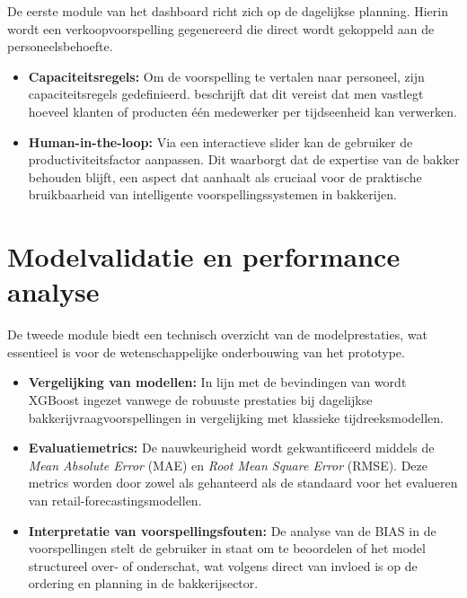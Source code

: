 De eerste module van het dashboard richt zich op de dagelijkse planning. Hierin wordt een verkoopvoorspelling gegenereerd die direct wordt gekoppeld aan de personeelsbehoefte.

\begin{itemize}
    \item \textbf{Capaciteitsregels:} Om de voorspelling te vertalen naar personeel, zijn capaciteitsregels gedefinieerd. \cite{Geboers2012} beschrijft dat dit vereist dat men vastlegt hoeveel klanten of producten één medewerker per tijdseenheid kan verwerken.
    \item \textbf{Human-in-the-loop:} Via een interactieve slider kan de gebruiker de productiviteitsfactor aanpassen. Dit waarborgt dat de expertise van de bakker behouden blijft, een aspect dat \cite{Subekti2025} aanhaalt als cruciaal voor de praktische bruikbaarheid van intelligente voorspellingssystemen in bakkerijen.
\end{itemize}

\section{Modelvalidatie en performance analyse}
\label{sec:performance}

De tweede module biedt een technisch overzicht van de modelprestaties, wat essentieel is voor de wetenschappelijke onderbouwing van het prototype.

\begin{itemize}
    \item \textbf{Vergelijking van modellen:} In lijn met de bevindingen van \cite{Easter2024} wordt XGBoost ingezet vanwege de robuuste prestaties bij dagelijkse bakkerijvraagvoorspellingen in vergelijking met klassieke tijdreeksmodellen.
    \item \textbf{Evaluatiemetrics:} De nauwkeurigheid wordt gekwantificeerd middels de \textit{Mean Absolute Error} (MAE) en \textit{Root Mean Square Error} (RMSE). Deze metrics worden door zowel \cite{GangulyMukherjee2024} als \cite{Easter2024} gehanteerd als de standaard voor het evalueren van retail-forecastingsmodellen.
    \item \textbf{Interpretatie van voorspellingsfouten:} De analyse van de BIAS in de voorspellingen stelt de gebruiker in staat om te beoordelen of het model structureel over- of onderschat, wat volgens \cite{Geboers2012} direct van invloed is op de ordering en planning in de bakkerijsector.
\end{itemize}